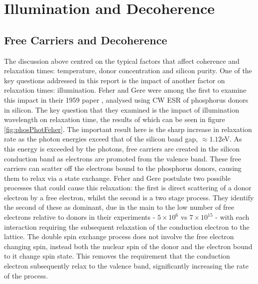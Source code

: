 \section{Illumination and Decoherence}

\subsection{Free Carriers and Decoherence}

The discussion above centred on the typical factors that affect coherence and relaxation times:  temperature, donor concentration and silicon purity.
One of the key questions addressed in this report is the impact of another factor on relaxation times: illumination.
Feher and Gere were among the first to examine this impact in their 1959 paper \cite{Gere1959}, analysed using CW ESR of phosphorus donors in silicon. 
The key question that they examined is the impact of illumination wavelength on relaxation time, the results of which can be seen in figure \ref{fig:phosPhotFeher}. 
The important result here is the sharp increase in relaxation rate as the photon energies exceed that of the silicon band gap, $\approx 1.12$eV.
As this energy is exceeded by the photons, free carriers are created in the silicon conduction band as electrons are promoted from the valence band.
These free carriers can scatter off the electrons bound to the phosphorus donors, causing them to relax via a state exchange.
Feher and Gere postulate two possible processes that could cause this relaxation: the first is direct scattering of a donor electron by a free electron, whilst the second is a two stage process.
They identify the second of these as dominant, due in the main to the low number of free electrons relative to donors in their experiments - $5\times10^6$ vs $7\times10^{15}$ - with each interaction requiring the subsequent relaxation of the conduction electron to the lattice.
The double spin exchange process does not involve the free electron changing spin, instead both the nuclear spin of the donor and the electron bound to it change spin state. 
This removes the requirement that the conduction electron subsequently relax to the valence band, significantly increasing the rate of the process.
\\

